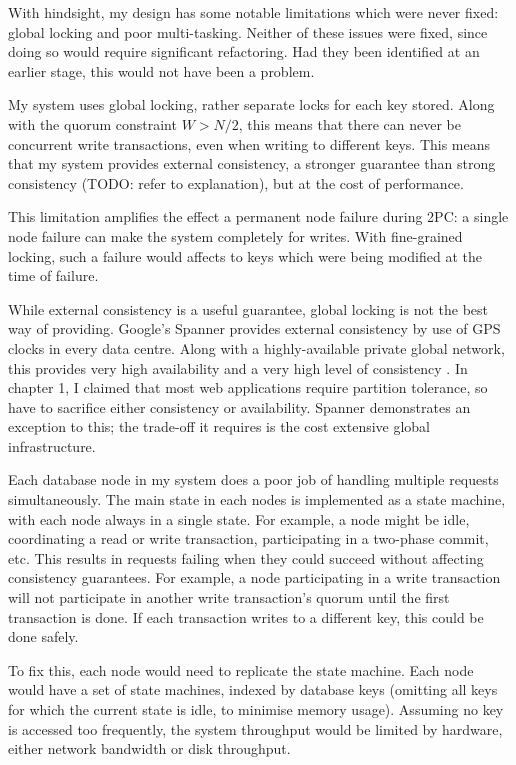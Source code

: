 \documentclass[12pt,a4paper,twoside,openany]{report}
\begin{document}

With hindsight, my design has some notable limitations which were never fixed: global locking and poor multi-tasking. Neither of these issues were fixed, since doing so would require significant refactoring. Had they been identified at an earlier stage, this would not have been a problem.

My system uses global locking, rather separate locks for each key stored. Along with the quorum constraint $W > N/2$, this means that there can never be concurrent write transactions, even when writing to different keys. This means that my system provides external consistency, a stronger guarantee than strong consistency (TODO: refer to explanation), but at the cost of performance.

This limitation amplifies the effect a permanent node failure during 2PC: a single node failure can make the system completely for writes. With fine-grained locking, such a failure would affects to keys which were being modified at the time of failure.

While external consistency is a useful guarantee, global locking is not the best way of providing. Google's Spanner provides external consistency by use of GPS clocks in every data centre. Along with a highly-available private global network, this provides very high availability and a very high level of consistency \cite{45855}. In chapter 1, I claimed that most web applications require partition tolerance, so have to sacrifice either consistency or availability. Spanner demonstrates an exception to this; the trade-off it requires is the cost extensive global infrastructure.

Each database node in my system does a poor job of handling multiple requests simultaneously. The main state in each nodes is implemented as a state machine, with each node always in a single state. For example, a node might be idle, coordinating a read or write transaction, participating in a two-phase commit, etc. This results in requests failing when they could succeed without affecting consistency guarantees. For example, a node participating in a write transaction will not participate in another write transaction's quorum until the first transaction is done. If each transaction writes to a different key, this could be done safely.

To fix this, each node would need to replicate the state machine. Each node would have a set of state machines, indexed by database keys (omitting all keys for which the current state is idle, to minimise memory usage). Assuming no key is accessed too frequently, the system throughput would be limited by hardware, either network bandwidth or disk throughput.
\end{document}

